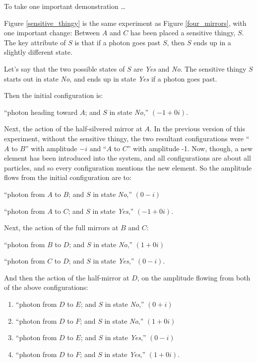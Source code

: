 {
 To take one important demonstration \ldots}


{
 Figure \ref{sensitive_thingy} is the same experiment as Figure \ref{four_mirrors}, with one
important change: Between $A$ and $C$ has been placed a sensitive thingy,
$S$. The key attribute of $S$ is that if a photon goes past $S$, then $S$ ends
up in a slightly different state.}

{
 Let's say that the two possible states of $S$ are
\textit{Yes} and \textit{No}. The sensitive thingy $S$ starts out in
state \textit{No}, and ends up in state \textit{Yes} if a photon goes
past.}

{
 Then the initial configuration is:}

{
 ``photon heading toward $A$; and $S$ in state
\textit{No},'' $(-1 + 0i)$.}

{
 Next, the action of the half-silvered mirror at $A$. In the previous
version of this experiment, without the sensitive thingy, the two
resultant configurations were ``$A$ to
$B$'' with amplitude $-i$ and ``$A$ to
$C$'' with amplitude -1. Now, though, a new element has
been introduced into the system, and all configurations are about all
particles, and so every configuration mentions the new element. So the
amplitude flows from the initial configuration are to:}

{
 ``photon from $A$ to $B$; and $S$ in state
\textit{No},'' $(0 - i)$}

{
 ``photon from $A$ to $C$; and $S$ in state
\textit{Yes},'' $(-1 + 0i)$.}

{
 Next, the action of the full mirrors at $B$ and $C$:}

{
 ``photon from $B$ to $D$; and $S$ in state
\textit{No},'' $(1 + 0i)$}

{
 ``photon from $C$ to $D$; and $S$ in state
\textit{Yes},'' $(0 - i)$.}

{
 And then the action of the half-mirror at $D$, on the amplitude
flowing from both of the above configurations:}

\begin{enumerate}
\item {
 ``photon from $D$ to $E$; and $S$ in state
\textit{No},'' $(0 + i)$}

\item {
 ``photon from $D$ to $F$; and $S$ in state
\textit{No},'' $(1 + 0i)$}

\item {
 ``photon from $D$ to $E$; and $S$ in state
\textit{Yes},'' $(0 - i)$}

\item {
 ``photon from $D$ to $F$; and $S$ in state
  \textit{Yes},'' $(1 + 0i)$.}
\end{enumerate}

